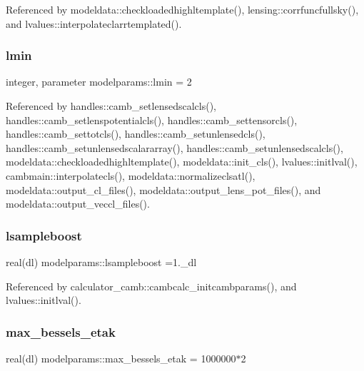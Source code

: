 Referenced by modeldata\+::checkloadedhighltemplate(), lensing\+::corrfuncfullsky(), and lvalues\+::interpolateclarrtemplated().

\mbox{\label{namespacemodelparams_ac592a5921d58b2abb1fb48bb520fd87b}} 
\subsubsection{\texorpdfstring{lmin}{lmin}}
{\footnotesize\ttfamily integer, parameter modelparams\+::lmin = 2}



Referenced by handles\+::camb\+\_\+setlensedscalcls(), handles\+::camb\+\_\+setlenspotentialcls(), handles\+::camb\+\_\+settensorcls(), handles\+::camb\+\_\+settotcls(), handles\+::camb\+\_\+setunlensedcls(), handles\+::camb\+\_\+setunlensedscalararray(), handles\+::camb\+\_\+setunlensedscalcls(), modeldata\+::checkloadedhighltemplate(), modeldata\+::init\+\_\+cls(), lvalues\+::initlval(), cambmain\+::interpolatecls(), modeldata\+::normalizeclsatl(), modeldata\+::output\+\_\+cl\+\_\+files(), modeldata\+::output\+\_\+lens\+\_\+pot\+\_\+files(), and modeldata\+::output\+\_\+veccl\+\_\+files().

\mbox{\label{namespacemodelparams_ab2930a201db30785a690dd81ab50f4d2}} 
\subsubsection{\texorpdfstring{lsampleboost}{lsampleboost}}
{\footnotesize\ttfamily real(dl) modelparams\+::lsampleboost =1.\+\_\+dl}



Referenced by calculator\+\_\+camb\+::cambcalc\+\_\+initcambparams(), and lvalues\+::initlval().

\mbox{\label{namespacemodelparams_a7a677586a4085c9c337cac0d8a025dc6}} 
\subsubsection{\texorpdfstring{max\+\_\+bessels\+\_\+etak}{max\_bessels\_etak}}
{\footnotesize\ttfamily real(dl) modelparams\+::max\+\_\+bessels\+\_\+etak = 1000000$\ast$2}



